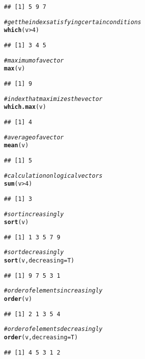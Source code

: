\documentclass[12pt]{article}\usepackage[]{graphicx}\usepackage[]{color}
\makeatletter
\newcommand{\hlnum}[1]{\textcolor[rgb]{0.686,0.059,0.569}{#1}}%
\newcommand{\hlcom}[1]{\textcolor[rgb]{0.678,0.584,0.686}{\textit{#1}}}%
\newcommand{\hlopt}[1]{\textcolor[rgb]{0,0,0}{#1}}%
\newcommand{\hlstd}[1]{\textcolor[rgb]{0.345,0.345,0.345}{#1}}%
\newcommand{\hlkwc}[1]{\textcolor[rgb]{0.333,0.667,0.333}{#1}}%
\newcommand{\hlkwd}[1]{\textcolor[rgb]{0.737,0.353,0.396}{\textbf{#1}}}%
\newenvironment{kframe}{%
 \def\at@end@of@kframe{}%
 \ifinner\ifhmode%
  \def\at@end@of@kframe{\end{minipage}}%
  \begin{minipage}{\columnwidth}%
 \fi\fi%
 \def\FrameCommand##1{\hskip\@totalleftmargin \hskip-\fboxsep
 \colorbox{shadecolor}{##1}\hskip-\fboxsep
     \hskip-\linewidth \hskip-\@totalleftmargin \hskip\columnwidth}%
 \MakeFramed {\advance\hsize-\width
   \@totalleftmargin\z@ \linewidth\hsize
   \@setminipage}}%
 {\par\unskip\endMakeFramed%
 \at@end@of@kframe}
\newenvironment{knitrout}{}{} %
\makeatother
\begin{document}
\begin{knitrout}
\begin{kframe}
\begin{alltt}
\end{alltt}
\begin{verbatim}
## [1] 5 9 7
\end{verbatim}
\begin{alltt}
\hlcom{# get the index satisfying certain conditions}
\hlkwd{which}\hlstd{(v}\hlopt{>}\hlnum{4}\hlstd{)}
\end{alltt}
\begin{verbatim}
## [1] 3 4 5
\end{verbatim}
\begin{alltt}
\hlcom{# maximum of a vector}
\hlkwd{max}\hlstd{(v)}
\end{alltt}
\begin{verbatim}
## [1] 9
\end{verbatim}
\begin{alltt}
\hlcom{# index that maximizes the vector}
\hlkwd{which.max}\hlstd{(v)}
\end{alltt}
\begin{verbatim}
## [1] 4
\end{verbatim}
\begin{alltt}
\hlcom{# average of a vector}
\hlkwd{mean}\hlstd{(v)}
\end{alltt}
\begin{verbatim}
## [1] 5
\end{verbatim}
\begin{alltt}
\hlcom{# calculation on logical vectors}
\hlkwd{sum}\hlstd{(v}\hlopt{>}\hlnum{4}\hlstd{)}
\end{alltt}
\begin{verbatim}
## [1] 3
\end{verbatim}
\begin{alltt}
\hlcom{# sort increasingly}
\hlkwd{sort}\hlstd{(v)}
\end{alltt}
\begin{verbatim}
## [1] 1 3 5 7 9
\end{verbatim}
\begin{alltt}
\hlcom{# sort decreasingly}
\hlkwd{sort}\hlstd{(v,} \hlkwc{decreasing} \hlstd{= T)}
\end{alltt}
\begin{verbatim}
## [1] 9 7 5 3 1
\end{verbatim}
\begin{alltt}
\hlcom{# order of elements increasingly}
\hlkwd{order}\hlstd{(v)}
\end{alltt}
\begin{verbatim}
## [1] 2 1 3 5 4
\end{verbatim}
\begin{alltt}
\hlcom{# order of elements decreasingly}
\hlkwd{order}\hlstd{(v,}\hlkwc{decreasing} \hlstd{= T)}
\end{alltt}
\begin{verbatim}
## [1] 4 5 3 1 2
\end{verbatim}
\end{kframe}
\end{knitrout}
  
\end{document}
